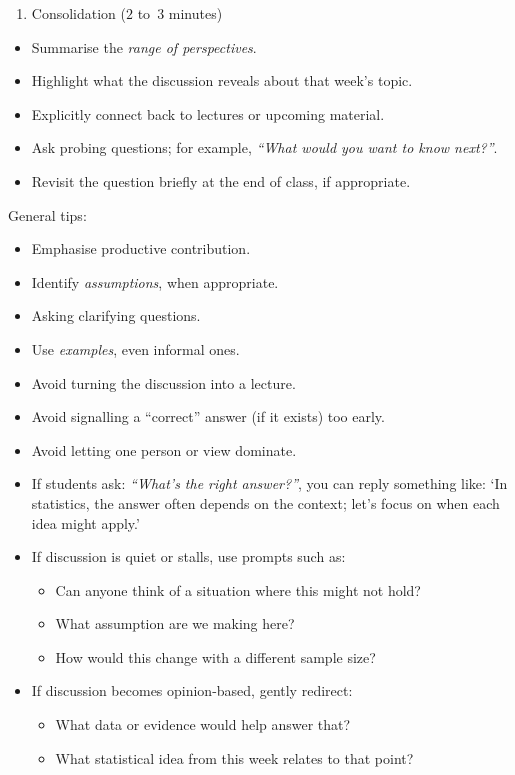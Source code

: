 \documentclass[
  11pt,
  a4paper,
  krantz2]{krantz}
\providecommand{\tightlist}{%
  \setlength{\itemsep}{0pt}\setlength{\parskip}{0pt}}
\begin{document}
\begin{enumerate}
\def\labelenumi{\arabic{enumi}.}
\setcounter{enumi}{2}
\tightlist
\item
  Consolidation (\(2\) to~\(3\) minutes)
\end{enumerate}

\begin{itemize}
\tightlist
\item
  Summarise the \emph{range of perspectives}.
\item
  Highlight what the discussion reveals about that week's topic.
\item
  Explicitly connect back to lectures or upcoming material.
\item
  Ask probing questions; for example, \emph{``What would you want to know next?''}.
\item
  Revisit the question briefly at the end of class, if appropriate.
\end{itemize}

General tips:

\begin{itemize}
\tightlist
\item
  Emphasise productive contribution.
\item
  Identify \emph{assumptions}, when appropriate.
\item
  Asking clarifying questions.
\item
  Use \emph{examples}, even informal ones.
\item
  Avoid turning the discussion into a lecture.
\item
  Avoid signalling a ``correct'' answer (if it exists) too early.
\item
  Avoid letting one person or view dominate.
\item
  If students ask: \emph{``What's the right answer?''}, you can reply something like: `In statistics, the answer often depends on the context; let's focus on when each idea might apply.'
\item
  If discussion is quiet or stalls, use prompts such as:

  \begin{itemize}
  \tightlist
  \item
    Can anyone think of a situation where this might not hold?
  \item
    What assumption are we making here?
  \item
    How would this change with a different sample size?
  \end{itemize}
\item
  If discussion becomes opinion-based, gently redirect:

  \begin{itemize}
  \tightlist
  \item
    What data or evidence would help answer that?
  \item
    What statistical idea from this week relates to that point?
  \end{itemize}
\end{itemize}
\end{document}
